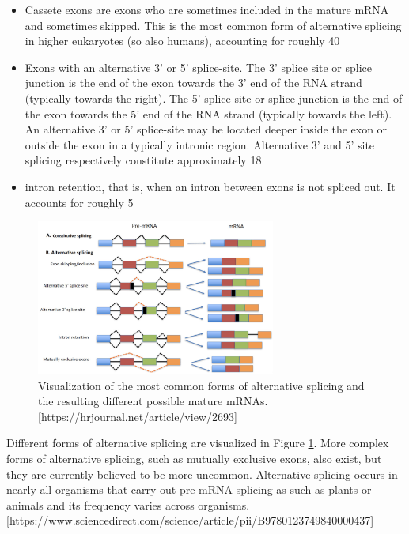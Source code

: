 \begin{itemize}
\item Cassete exons are exons who are sometimes included in the mature mRNA and sometimes skipped. This is the most common form of alternative splicing in higher eukaryotes (so also humans), accounting for roughly 40%
\item Exons with an alternative 3' or 5' splice-site. The 3' splice site or splice junction is the end of the exon towards the 3' end of the RNA strand (typically towards the right). The 5' splice site or splice junction is the end of the exon towards the 5' end of the RNA strand (typically towards the left). An alternative 3' or 5' splice-site may be located deeper inside the exon or outside the exon in a typically intronic region. Alternative 3' and 5' site splicing respectively constitute approximately 18%
\item intron retention, that is, when an intron between exons is not spliced out. It accounts for roughly 5%
\end{itemize}

\begin{figure}
	\centering\includegraphics[width=0.7\textwidth]{../visualizations/alternative_splicing_forms.png} 
	\caption[test]
	{Visualization of the most common forms of alternative splicing and the resulting different possible mature mRNAs.
	[https://hrjournal.net/article/view/2693]
}
	\label{fig:altsplicingforms}
\end{figure}

Different forms of alternative splicing are visualized in Figure \ref{fig:altsplicingforms}. More complex forms of alternative splicing, such as mutually exclusive exons, also exist, but they are currently believed to be more uncommon. Alternative splicing occurs in nearly all organisms that carry out pre-mRNA splicing as such as plants or animals and its frequency varies across organisms. [https://www.sciencedirect.com/science/article/pii/B9780123749840000437]
